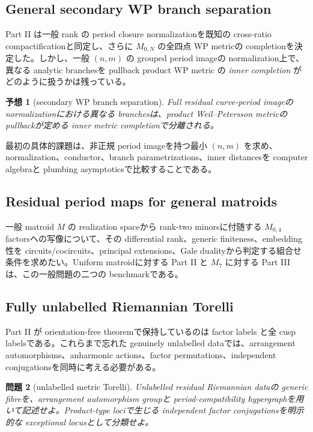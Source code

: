 \documentclass[11pt,a4paper]{ltjsarticle}
\theoremstyle{plain}
\newtheorem{conjecture}{予想}[section]
\newtheorem{problem}[conjecture]{問題}
\theoremstyle{definition}
\theoremstyle{remark}
\begin{document}
\subsection{General secondary WP branch separation}

Part II は一般 rank の period closure normalizationを既知の cross-ratio compactificationと同定し、さらに $M_{0,N}$ の全四点 WP metricの completionを決定した。しかし、一般 $(n,m)$ の grouped period imageの normalization上で、異なる analytic branchesを pullback product WP metric の \emph{inner completion} がどのように扱うかは残っている。

\begin{conjecture}[secondary WP branch separation]\label{conj:wp-branch-v22}
Full residual curve-period imageの normalizationにおける異なる branchesは、product Weil--Petersson metricの pullbackが定める inner metric completionで分離される。
\end{conjecture}

最初の具体的課題は、非正規 period imageを持つ最小 $(n,m)$ を求め、normalization、conductor、branch parametrizations、inner distancesを computer algebraと plumbing asymptoticsで比較することである。

\subsection{Residual period maps for general matroids}

一般 matroid $M$ の realization spaceから rank-two minorsに付随する $M_{0,4}$ factorsへの写像について、その differential rank、generic finiteness、embedding性を circuits/cocircuits、principal extensions、Gale dualityから判定する組合せ条件を求めたい。Uniform matroidに対する Part II と $M_7$ に対する Part III は、この一般問題の二つの benchmarkである。

\subsection{Fully unlabelled Riemannian Torelli}

Part II が orientation-free theoremで保持しているのは factor labels と全 cusp labelsである。これらまで忘れた genuinely unlabelled dataでは、arrangement automorphisms、anharmonic actions、factor permutations、independent conjugationsを同時に考える必要がある。

\begin{problem}[unlabelled metric Torelli]\label{prob:unlabelled-v22}
Unlabelled residual Riemannian dataの generic fibreを、arrangement automorphism groupと period-compatibility hypergraphを用いて記述せよ。Product-type lociで生じる independent factor conjugationsを明示的な exceptional locusとして分類せよ。
\end{problem}
\end{document}
